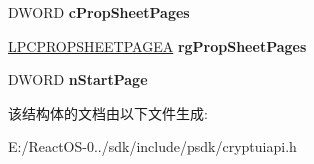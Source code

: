 \begin{DoxyCompactItemize}
D\+W\+O\+RD {\bfseries c\+Prop\+Sheet\+Pages}
\item 
\mbox{\label{structtag_c_r_y_p_t_u_i___v_i_e_w_c_e_r_t_i_f_i_c_a_t_e___s_t_r_u_c_t_a_a1a7cda418eae92feccd3387ecde01f39}} 
\hyperlink{struct___p_r_o_p_s_h_e_e_t_p_a_g_e_a}{L\+P\+C\+P\+R\+O\+P\+S\+H\+E\+E\+T\+P\+A\+G\+EA} {\bfseries rg\+Prop\+Sheet\+Pages}
\item 
\mbox{\label{structtag_c_r_y_p_t_u_i___v_i_e_w_c_e_r_t_i_f_i_c_a_t_e___s_t_r_u_c_t_a_a45458410c96ce293498f27b6d6690bef}} 
D\+W\+O\+RD {\bfseries n\+Start\+Page}
\end{DoxyCompactItemize}


该结构体的文档由以下文件生成\+:\begin{DoxyCompactItemize}
\item 
E\+:/\+React\+O\+S-\/0../sdk/include/psdk/cryptuiapi.\+h\end{DoxyCompactItemize}
